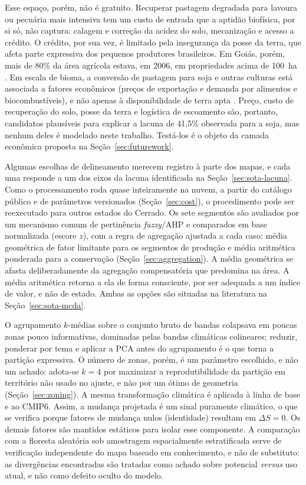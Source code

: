 Esse espaço, porém, não é gratuito. Recuperar pastagem degradada para lavoura ou pecuária mais
intensiva tem um custo de entrada que a aptidão biofísica, por si só, não captura: calagem e
correção da acidez do solo, mecanização e acesso a crédito. O crédito, por sua vez, é limitado pela
insegurança da posse da terra, que afeta parte expressiva dos pequenos produtores brasileiros. Em Goiás,
porém, mais de 80\% da área agrícola estava, em 2006, em propriedades acima de 100~ha
\citep[pp.~2, 5]{spera_agricultural_2017}. Em escala de bioma, a conversão de pastagem para soja e
outras culturas está associada a fatores econômicos (preços de exportação e demanda por alimentos e
biocombustíveis), e não apenas à disponibilidade de terra apta
\citep[pp.~10, 12]{caballero_transformation_2023}. Preço, custo de recuperação do solo, posse da terra
e logística de escoamento são, portanto, candidatos plausíveis para explicar a lacuna de 41,5\%
observada para a soja, mas nenhum deles é modelado neste trabalho. Testá-los é o objeto da camada
econômica proposta na Seção~\ref{sec:futurework}.

Algumas escolhas de delineamento merecem registro à parte dos mapas, e cada uma responde a um dos eixos
da lacuna identificada na Seção~\ref{sec:sota-lacuna}. Como o processamento roda quase inteiramente na
nuvem, a partir do catálogo público e de parâmetros versionados (Seção~\ref{sec:cost}), o procedimento
pode ser reexecutado para outros estados do Cerrado. Os sete segmentos são avaliados por um mecanismo
comum de pertinência \emph{fuzzy}/AHP e comparados em base normalizada (escore $z$), com a regra de
agregação ajustada a cada caso: média geométrica de fator limitante para os segmentos de produção e
média aritmética ponderada para a conservação (Seção~\ref{sec:aggregation}). A média geométrica se
afasta deliberadamente da agregação compensatória que predomina na área. A média aritmética retorna a
ela de forma consciente, por ser adequada a um índice de valor, e não de estado. Ambas as opções são
situadas na literatura na Seção~\ref{sec:sota-mcda}.

O agrupamento $k$-médias sobre o conjunto bruto de bandas colapsava em poucas zonas pouco
informativas, dominadas pelas bandas climáticas colineares; reduzir, ponderar por tema e aplicar a
PCA antes do agrupamento é o que torna a partição expressiva. O número de zonas, porém, é um
parâmetro escolhido, e não um achado: adota-se $k = 4$ por maximizar a reprodutibilidade da
partição em território não usado no ajuste, e não por um ótimo de geometria (Seção~\ref{sec:zoning}).
A mesma transformação climática é aplicada à linha de base e ao CMIP6. Assim, a mudança projetada é um
sinal puramente climático, o que se verifica porque fatores de mudança nulos (identidade) resultam em
$\Delta S = 0$. Os demais fatores são mantidos estáticos para isolar esse componente. A comparação com
a floresta aleatória sob amostragem espacialmente estratificada serve de verificação independente do
mapa baseado em conhecimento, e não de substituto: as divergências encontradas são tratadas como achado
sobre potencial \emph{versus} uso atual, e não como defeito oculto do modelo.

